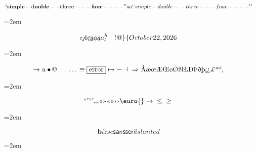 \documentclass{book}
\begin{document}
\endgroup{}%
$$
\mathbf{``simple-double--three---four----''} \hbox{aa}
`\hbox{}`simple-double-\hbox{}-three---four----'\hbox{}'
$$
\par\begingroup\obeylines\obeyspaces\frenchspacing\leftskip=2em\relax\parskip=0pt\relax\ttfamily{}%

\endgroup{}%
$$
\imath{} \jmath{}
\mathord{\text{\l{}}} \textsl{\c{c}}
\textsl{\b{a}} \textsl{\d{a}} \textsl{\k{a}} a^{h}_{l}
 \ {}\ {} \ {}\-{}  ! @ \} \{ 
\today{}
$$
\par\begingroup\obeylines\obeyspaces\frenchspacing\leftskip=2em\relax\parskip=0pt\relax\ttfamily{}%

\endgroup{}%
$$
\rightarrow{}
u
\bullet{} \copyright{} \dots{} \dots{} \equiv{}
\fbox{error} \mapsto{} - \dashv{} \Rightarrow{}
\mathord{\text{\AA{}}} \mathord{\text{\ae{}}} \mathord{\text{\oe{}}} \mathord{\text{\AE{}}} \mathord{\text{\OE{}}} \mathord{\text{\o{}}} \mathord{\text{\O{}}} \mathord{\text{\ss{}}} \mathord{\text{\l{}}} \mathord{\text{\L{}}} \mathord{\text{\DH{}}}
\mathord{\text{\TH{}}} \mathord{\text{\dh{}}} \mathord{\text{\th{}}} \mathord{\text{\textexclamdown{}}} \mathord{\text{\textquestiondown{}}} \mathsterling{}
\mathord{\text{\textordfeminine{}}} \mathord{\text{\textordmasculine{}}} , 
$$
\par\begingroup\obeylines\obeyspaces\frenchspacing\leftskip=2em\relax\parskip=0pt\relax\ttfamily{}%

\endgroup{}%
$$
\mathord{\text{\textquotedblleft{}}} \mathord{\text{\textquotedblright{}}} 
\mathord{\text{\textquoteleft{}}} \mathord{\text{\textquoteright{}}} \mathord{\text{\quotedblbase{}}} \mathord{\text{\quotesinglbase{}}} \mathord{\text{\guillemotleft{}}}
\mathord{\text{\guillemotright{}}} \mathord{\text{\guillemotleft{}}} \mathord{\text{\guillemotright{}}} \mathord{\text{\guilsinglleft{}}}
\mathord{\text{\guilsinglright{}}} \euro{} \rightarrow{} \leq{} \geq{}
$$
\par\begingroup\obeylines\obeyspaces\frenchspacing\leftskip=2em\relax\parskip=0pt\relax\ttfamily{}%

\endgroup{}%
$$
\mathbf{b} \mathit{i} \mathrm{r} sc \mathsf{sansserif} slanted
$$
\par\begingroup\obeylines\obeyspaces\frenchspacing\leftskip=2em\relax\parskip=0pt\relax\ttfamily{}%
\end{document}
